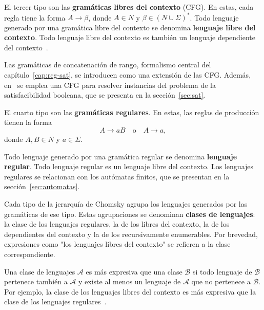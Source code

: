 \documentclass{article}
\theoremstyle{definition}
\theoremstyle{plain}
\theoremstyle{remark}
\begin{document}
El tercer tipo son las \textbf{gramáticas libres del contexto} (CFG).
En estas, cada regla tiene la forma $A \to \beta$, donde $A \in N$ y
$\beta \in (N \cup \Sigma)^*$. Todo lenguaje generado por una gramática
libre del contexto se denomina \textbf{lenguaje libre del contexto}.
Todo lenguaje libre del contexto es también un lenguaje dependiente del
contexto~\cite{hopcroft2006introduction}.

Las gramáticas de concatenación de rango, formalismo central del
capítulo~\ref{cap:rcg-sat}, se introducen como una extensión de las
CFG. Además, en~\cite{fernandezarias2007} se emplea una CFG para
resolver instancias del problema de la satisfacibilidad booleana, que
se presenta en la sección~\ref{sec:sat}.

El cuarto tipo son las \textbf{gramáticas regulares}. En estas, las
reglas de producción tienen la forma
\[
  A \to aB \quad \text{o} \quad A \to a,
\]
donde $A, B \in N$ y $a \in \Sigma$.

Todo lenguaje generado por una gramática regular se denomina
\textbf{lenguaje regular}. Todo lenguaje regular es un lenguaje libre
del contexto. Los lenguajes regulares se relacionan con los autómatas
finitos, que se presentan en la sección~\ref{sec:automatas}.

Cada tipo de la jerarquía de Chomsky agrupa los lenguajes generados
por las gramáticas de ese tipo. Estas agrupaciones se denominan
\textbf{clases de lenguajes}: la clase de los lenguajes regulares, la
de los libres del contexto, la de los dependientes del contexto y la
de los recursivamente enumerables. Por brevedad, expresiones como "los
lenguajes libres del contexto" se refieren a la clase correspondiente.

Una clase de lenguajes $\mathcal{A}$ es más expresiva que una clase
$\mathcal{B}$ si todo lenguaje de $\mathcal{B}$ pertenece también a
$\mathcal{A}$ y existe al menos un lenguaje de $\mathcal{A}$ que no
pertenece a $\mathcal{B}$. Por ejemplo, la clase de los lenguajes
libres del contexto es más expresiva que la clase de los lenguajes
regulares~\cite{hopcroft2006introduction}.
\end{document}
